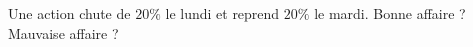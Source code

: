 
\begin{exercice}\label{exoPremiere-0003}

    Une action chute de \( 20\%\) le lundi et reprend \( 20\%\) le mardi. Bonne affaire ? Mauvaise affaire ?

\end{exercice}
